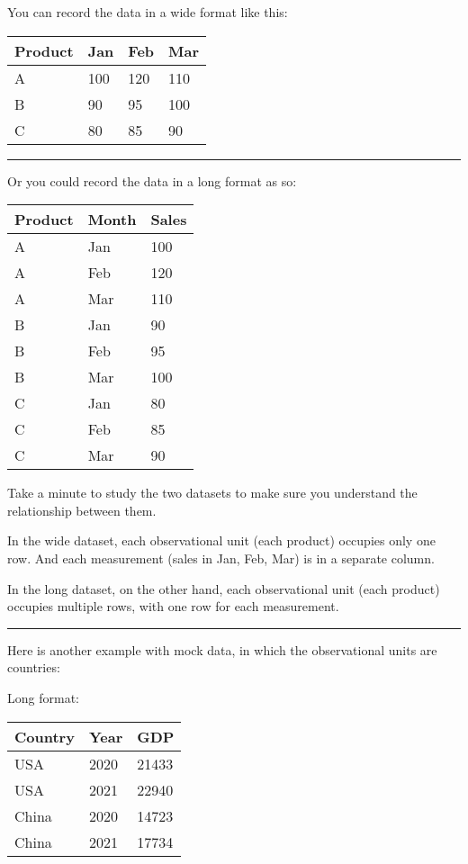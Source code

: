 \documentclass[
  letterpaper,
  DIV=11,
  numbers=noendperiod]{scrreprt}
\begin{document}
You can record the data in a wide format like this:

\begin{longtable}[]{@{}llll@{}}
\toprule\noalign{}
Product & Jan & Feb & Mar \\
\midrule\noalign{}
\endhead
\bottomrule\noalign{}
\endlastfoot
A & 100 & 120 & 110 \\
B & 90 & 95 & 100 \\
C & 80 & 85 & 90 \\
\end{longtable}

\begin{center}\rule{0.5\linewidth}{0.5pt}\end{center}

Or you could record the data in a long format as so:

\begin{longtable}[]{@{}lll@{}}
\toprule\noalign{}
Product & Month & Sales \\
\midrule\noalign{}
\endhead
\bottomrule\noalign{}
\endlastfoot
A & Jan & 100 \\
A & Feb & 120 \\
A & Mar & 110 \\
B & Jan & 90 \\
B & Feb & 95 \\
B & Mar & 100 \\
C & Jan & 80 \\
C & Feb & 85 \\
C & Mar & 90 \\
\end{longtable}

Take a minute to study the two datasets to make sure you understand the
relationship between them.

In the wide dataset, each observational unit (each product) occupies
only one row. And each measurement (sales in Jan, Feb, Mar) is in a
separate column.

In the long dataset, on the other hand, each observational unit (each
product) occupies multiple rows, with one row for each measurement.

\begin{center}\rule{0.5\linewidth}{0.5pt}\end{center}

Here is another example with mock data, in which the observational units
are countries:

Long format:

\begin{longtable}[]{@{}lll@{}}
\toprule\noalign{}
Country & Year & GDP \\
\midrule\noalign{}
\endhead
\bottomrule\noalign{}
\endlastfoot
USA & 2020 & 21433 \\
USA & 2021 & 22940 \\
China & 2020 & 14723 \\
China & 2021 & 17734 \\
\end{longtable}
\end{document}

